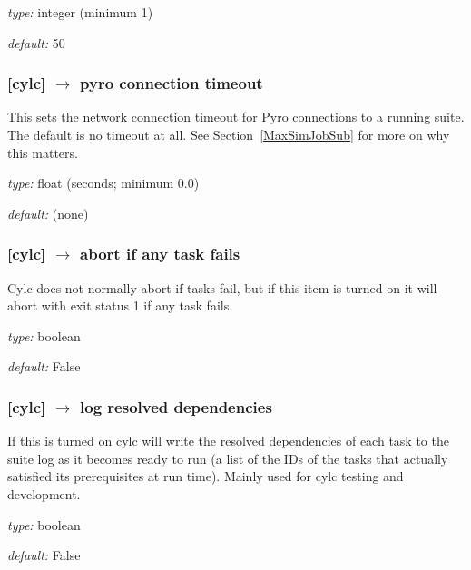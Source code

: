 \begin{myitemize}
    \item {\em type:} integer (minimum 1)
    \item {\em default:} 50
\end{myitemize}

\subsubsection[pyro connection timeout]{[cylc] $\rightarrow$ pyro connection timeout}

This sets the network connection timeout for Pyro connections to a
running suite. The default is no timeout at all. See
Section~\ref{MaxSimJobSub} for more on why this matters.

\begin{myitemize}
    \item {\em type:} float (seconds; minimum 0.0)
    \item {\em default:} (none)
\end{myitemize}


\subsubsection[abort if any task fails]{[cylc] $\rightarrow$ abort if any task fails}

Cylc does not normally abort if tasks fail, but if this item is turned
on it will abort with exit status 1 if any task fails.

\begin{myitemize}
    \item {\em type:} boolean
    \item {\em default:} False
\end{myitemize}

\subsubsection[log resolved dependencies]{[cylc] $\rightarrow$ log resolved dependencies}

If this is turned on cylc will write the resolved dependencies of each
task to the suite log as it becomes ready to run (a list of the IDs of
the tasks that actually satisfied its prerequisites at run time). Mainly
used for cylc testing and development.

\begin{myitemize}
    \item {\em type:} boolean
    \item {\em default:} False
\end{myitemize}

